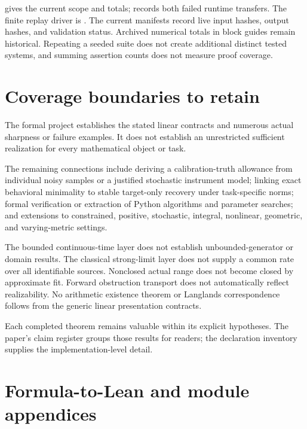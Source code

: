 \documentclass[11pt]{article}
\begin{document}
\texttt{}
gives the current scope and totals;
\texttt{} records
both failed runtime transfers. The finite replay driver is
\texttt{}.
The current manifests record live input hashes, output hashes, and
validation status. Archived numerical totals in block guides remain
historical. Repeating a seeded suite does not create additional distinct
tested systems, and summing assertion counts does not measure proof
coverage.

\hypertarget{coverage-boundaries-to-retain}{%
\section{Coverage boundaries to
retain}\label{coverage-boundaries-to-retain}}

The formal project establishes the stated linear contracts and numerous
actual sharpness or failure examples. It does not establish an
unrestricted sufficient realization for every mathematical object or
task.

The remaining connections include deriving a calibration-truth allowance
from individual noisy samples or a justified stochastic instrument
model; linking exact behavioral minimality to stable target-only
recovery under task-specific norms; formal verification or extraction of
Python algorithms and parameter searches; and extensions to constrained,
positive, stochastic, integral, nonlinear, geometric, and varying-metric
settings.

The bounded continuous-time layer does not establish unbounded-generator
or domain results. The classical strong-limit layer does not supply a
common rate over all identifiable sources. Nonclosed actual range does
not become closed by approximate fit. Forward obstruction transport does
not automatically reflect realizability. No arithmetic existence theorem
or Langlands correspondence follows from the generic linear presentation
contracts.

Each completed theorem remains valuable within its explicit hypotheses.
The paper's claim register groups those results for readers; the
declaration inventory supplies the implementation-level detail.

\hypertarget{formula-to-lean-and-module-appendices}{%
\section{Formula-to-Lean and module
appendices}\label{formula-to-lean-and-module-appendices}}
\end{document}
